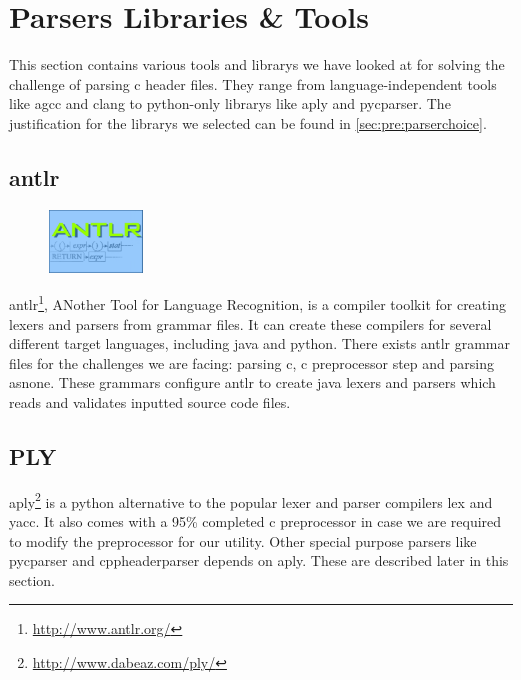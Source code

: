 \section{Parsers Libraries \& Tools}
\label{sec:pre:parser}
This section contains various tools and \glspl{library} we have looked at for solving
the challenge of parsing \Gls{c} \gls{header} files. They range from language-independent
tools like \gls{agcc} and \Gls{clang} to \Gls{python}-only \glspl{library} like \Gls{aply} and \gls{pycparser}. The
justification for the \glspl{library} we selected can be found in
\autoref{sec:pre:parserchoice}.

\subsection{\gls{antlr}}
\label{sec:pre:antlr}
\begin{figure}
	\vspace{-20pt}
	\includegraphics[width=2.5cm]{./planning/img/antlr_logo}
	\vspace{-20pt}
\end{figure}
\gls{antlr}\footnote{\url{http://www.antlr.org/}}, ANother Tool for Language
Recognition, is a compiler toolkit for creating \glspl{lexer} and \glspl{parser} from grammar
files. It can create these compilers for several different target languages,
including \Gls{java} and \Gls{python}. There exists \gls{antlr} grammar files for the challenges
we are facing: parsing \Gls{c}, \Gls{c} \gls{preprocessor} step and parsing \gls{asnone}. These grammars
configure \gls{antlr} to create \Gls{java} \glspl{lexer} and \glspl{parser} which reads and validates
inputted source code files.

\subsection{PLY}
\Gls{aply}\footnote{\url{http://www.dabeaz.com/ply/}} is a \Gls{python} alternative to the
popular \gls{lexer} and \gls{parser} compilers lex and yacc. It also comes with a 95\%
completed \Gls{c} \gls{preprocessor} in case we are required to modify the \gls{preprocessor}
for our \gls{utility}. Other special purpose \glspl{parser} like \gls{pycparser} and
cppheaderparser depends on \Gls{aply}. These are described later in this section.

